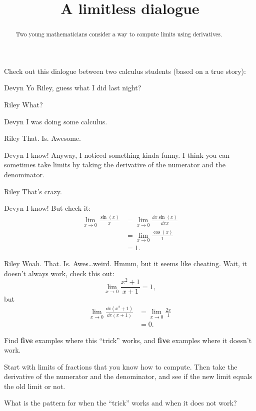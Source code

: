 \documentclass{ximera}
\title[Break-Ground:]{A limitless dialogue}
\begin{document}
\begin{abstract}
Two young mathematicians consider a way to compute limits using derivatives.
\end{abstract}
\maketitle

Check out this dialogue between two calculus students (based on a true
story):

\begin{dialogue}
\item[Devyn] Yo Riley, guess what I did last night?
\item[Riley] What?
\item[Devyn] I was doing some calculus.
\item[Riley] That. Is. Awesome.
\item[Devyn] I know! Anyway, I noticed something kinda funny. I
  think you can sometimes take limits by taking the derivative of the
  numerator and the denominator.
\item[Riley] That's crazy.
\item[Devyn] I know! But check it:
  \begin{align*}
    \lim_{x\to 0} \frac{\sin(x)}{x} &= \lim_{x\to 0} \frac{\dd{x}\sin(x)}{\dd{x}x}\\
    &= \lim_{x\to 0} \frac{\cos(x)}{1}\\
    &=1.
  \end{align*}
  \item[Riley] Woah. That. Is. Awes\dots weird. Hmmm, but it seems like
    cheating. Wait, it doesn't always work, check this out:
    \[
    \lim_{x\to 0} \frac{x^2+1}{x+1} = 1,
    \]
    but
    \begin{align*}
      \lim_{x\to 0} \frac{\dd{x}\left(x^2+1\right)}{\dd{x}\left(x+1\right)} &=
      \lim_{x\to 0} \frac{2x}{1} \\
      &=0.
    \end{align*}
\end{dialogue}

\begin{problem}
  Find \textbf{five} examples where this ``trick'' works, and
  \textbf{five} examples where it doesn't work.
  \begin{hint}
    Start with limits of fractions that you know how to compute. Then
    take the derivative of the numerator and the denominator, and see
    if the new limit equals the old limit or not.
  \end{hint}
  \begin{freeResponse}
  \end{freeResponse}
\end{problem}

\begin{problem}
  What is the pattern for when the ``trick'' works and when it does not work?
  \begin{freeResponse}
\end{freeResponse}
\end{problem}

%
\end{document}
